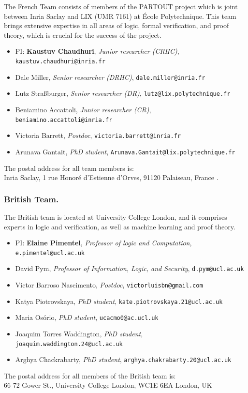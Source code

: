 \documentclass[a4paper]{article}
\newcommand{\fmemb}[4]{\item #1, \emph{#2}, {\tt #3}}
\newcommand{\sacaddr}{%
  Inria Saclay, 1 r. Honoré d'Estienne d'Orves, %
  91120 Palaiseau, France}
\newcommand{\sacaddrb}{%
  Inria Saclay, 1 rue Honor\'{e} d'Estienne d'Orves, %
  91120 Palaiseau, %
  France
}
\begin{document}
The French Team consists of members of the {\sc PARTOUT} project which is joint between Inria Saclay and LIX (UMR 7161) at \'{E}cole Polytechnique. This team brings extensive expertise in all areas of logic, formal verification, and proof theory, which is crucial for the success of the project.

\begin{itemize}[noitemsep]
\fmemb{PI: \textbf{Kaustuv Chaudhuri}}{Junior researcher (CRHC)}{kaustuv.chaudhuri@inria.fr}{\sacaddr}

\fmemb{Dale Miller}{Senior researcher (DRHC)}{dale.miller@inria.fr}{\sacaddr}

\fmemb{Lutz Stra\ss burger}{Senior researcher (DR)}{lutz@lix.polytechnique.fr}{\sacaddr}

\fmemb{Beniamino Accattoli}{Junior researcher (CR)}{beniamino.accattoli@inria.fr}{\sacaddr}

\fmemb{Victoria Barrett}{Postdoc}{victoria.barrett@inria.fr}{\sacaddr}

\fmemb{Arunava Gantait}{PhD student}{Arunava.Gantait@lix.polytechnique.fr}{\sacaddr}
\end{itemize}
The postal address for all team members is:\\[.5ex] \sacaddrb.


\subsubsection*{British Team.}

The British team is located at University College London, and it comprises experts in logic and verification, as well as machine learning and proof theory.
%
\begin{itemize}[noitemsep]
\fmemb{PI: \textbf{Elaine Pimentel}}{Professor of logic and Computation}{e.pimentel@ucl.ac.uk}{66-72 Gowe
r St., University College London,
WC1E 6EA London, UK}

\fmemb{David Pym}{Professor of Information, Logic, and Security}{d.pym@ucl.ac.uk}{66-72 Gower St., University College London,
WC1E 6EA London, UK}

\fmemb{Victor Barroso Nascimento}{Postdoc}{victorluisbn@gmail.com}{66-72 Gower St., University College London,
WC1E 6EA London, UK}

\fmemb{Katya Piotrovskaya}{PhD student}{kate.piotrovskaya.21@ucl.ac.uk}{66-72 Gower St., University College London,
WC1E 6EA London, UK}

\fmemb{Maria Os\'{o}rio}{PhD student}{ucacmo0@ac.ucl.uk}{66-72 Gower St., University College London,
WC1E 6EA London, UK}

\fmemb{Joaquim Torres Waddington}{PhD student}{joaquim.waddington.24@ucl.ac.uk}{66-72 Gower St., University College London,
WC1E 6EA London, UK}

\fmemb{Arghya Chackrabarty}{PhD student}{arghya.chakrabarty.20@ucl.ac.uk}{66-72 Gower St., University College London,
WC1E 6EA London, UK}

\end{itemize}
%
The postal address for all members of the British team is:\\[.75ex]
66-72 Gower St., University College London,
WC1E 6EA London, UK
\end{document}
